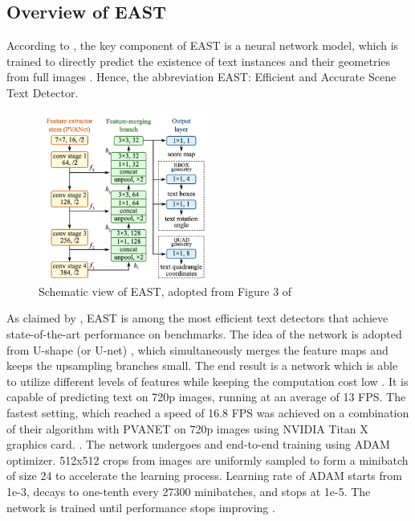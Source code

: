 \documentclass[10pt, a4paper]{article}
\begin{document}
\subsection{Overview of EAST} %
\label{sub:overvieweast}
According to \cite{EastZhouEtAl}, the key component of EAST is a neural network model, which is trained to directly predict the existence of text instances and their geometries from full images \citep{EastZhouEtAl}.
Hence, the abbreviation EAST: Efficient and Accurate Scene Text Detector.
\begin{figure}[hbt!]
	\centering
	\includegraphics[width=0.5\textwidth]{img/eaststructure.png}
	\caption{Schematic view of EAST, adopted from Figure 3 of~\protect\cite{EastZhouEtAl}}
	\label{fig:east1}
\end{figure}

As claimed by \cite{EastZhouEtAl}, EAST is among the most efficient text detectors that achieve state-of-the-art performance on benchmarks.
The idea of the network is adopted from U-shape (or U-net) \citep{unet}, which simultaneously merges the feature maps and keeps the upsampling branches small. The end result is a network which is able to utilize different levels of features while keeping the computation cost low \citep{EastZhouEtAl}.
It is capable of predicting text on 720p images, running at an average of 13 FPS. The fastest setting, which reached a speed of 16.8 FPS was achieved on a combination of their algorithm with PVANET on 720p images using NVIDIA Titan X graphics card. \citep{EastZhouEtAl}.
The network undergoes and end-to-end training using ADAM \citep{adam} optimizer. 512x512 crops from images are uniformly sampled to form a minibatch of size 24 to accelerate the learning process.
Learning rate of ADAM starts from 1e-3, decays to one-tenth every 27300 minibatches, and stops at 1e-5. The network is trained until performance stops improving \citep{EastZhouEtAl}.
\end{document}
